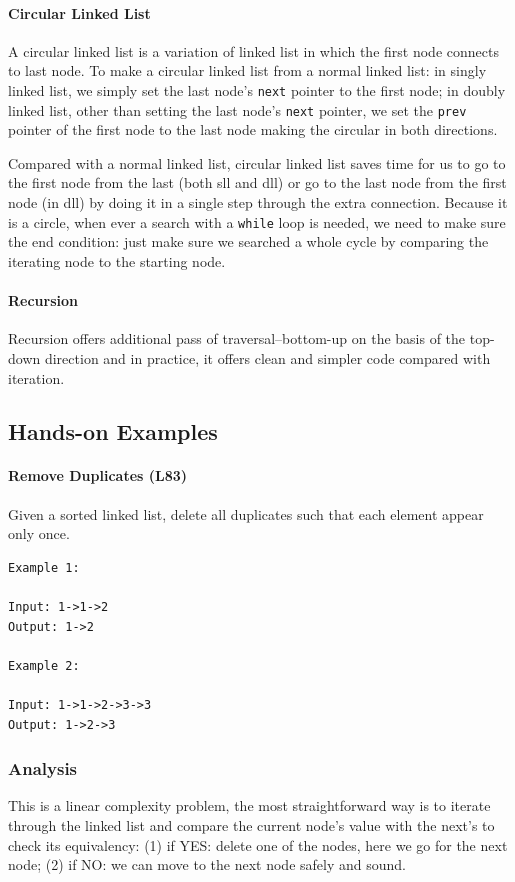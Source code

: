 \documentclass[../main.tex]{subfiles}
\begin{document}
\paragraph{Circular Linked List}
A circular linked list is a variation of linked list in which the first node connects to last node. To make a circular linked list from a normal linked list: in singly linked list, we simply set the last node's \texttt{next} pointer to the first node; in doubly linked list, other than setting the last node's \texttt{next} pointer, we set the \texttt{prev} pointer of the first node to the last node making the circular in both directions. 

Compared with a normal linked list, circular linked list saves time for us to go to the first node from the last (both sll and dll) or go to the last node from the first node (in dll) by doing it in a single step through the extra connection. Because it is a circle, when ever a search with a \texttt{while} loop is needed, we  need to make sure the end condition: just make sure we searched a whole cycle by comparing the iterating node to the starting node. 

\paragraph{Recursion} Recursion offers additional pass of traversal--bottom-up on the basis of the top-down direction and in practice, it offers clean and simpler code compared with iteration. 

\subsection{Hands-on Examples}
\paragraph{Remove Duplicates (L83)} Given a sorted linked list, delete all duplicates such that each element appear only once.
\begin{lstlisting}[numbers=none]
Example 1:

Input: 1->1->2
Output: 1->2

Example 2:

Input: 1->1->2->3->3
Output: 1->2->3
\end{lstlisting}

\subsubsection{Analysis} This is a linear complexity problem, the most straightforward way is to iterate through the linked list and compare the current node's value with the next's to check its equivalency: (1) if YES: delete one of the nodes, here we go for the next node; (2) if NO: we can move to the next node safely and sound.
\end{document}
